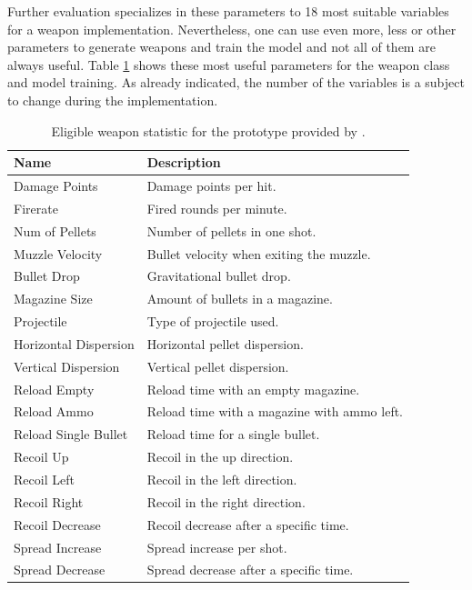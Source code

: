 \documentclass[MGS,Master,english]{twbook}%
\begin{document}
Further evaluation specializes in these parameters to 18 most suitable variables for a weapon implementation. Nevertheless, one can use even more, less or other parameters to generate weapons and train the model and not all of them are always useful. Table \ref{battlefield::weaponStats} shows these most useful parameters for the weapon class and model training. As already indicated, the number of the variables is a subject to change during the implementation.
\begin{table}[!ht]
	\centering
	\begin{tabular}{|l|l|}
		\hline
		\textbf{Name}         & \textbf{Description}                         \\ \hline\hline
		Damage Points         & Damage points per hit.                       \\ \hline
		Firerate              & Fired rounds per minute.                     \\ \hline
		Num of Pellets        & Number of pellets in one shot.               \\ \hline
		Muzzle Velocity       & Bullet velocity when exiting the muzzle.     \\ \hline
		Bullet Drop           & Gravitational bullet drop.                   \\ \hline
		Magazine Size         & Amount of bullets in a magazine.             \\ \hline
		Projectile            & Type of projectile used.                     \\ \hline
		Horizontal Dispersion & Horizontal pellet dispersion.                \\ \hline
		Vertical Dispersion   & Vertical pellet dispersion.                  \\ \hline
		Reload Empty          & Reload time with an empty magazine.          \\ \hline
		Reload Ammo           & Reload time with a magazine with ammo left. \\ \hline
		Reload Single Bullet  & Reload time for a single bullet.             \\ \hline
		Recoil Up             & Recoil in the up direction.                      \\ \hline
		Recoil Left           & Recoil in the left direction.                    \\ \hline
		Recoil Right          & Recoil in the right direction.                   \\ \hline
		Recoil Decrease       & Recoil decrease after a specific time.       \\ \hline
		Spread Increase       & Spread increase per shot.                    \\ \hline
		Spread Decrease       & Spread decrease after a specific time.       \\ \hline
	\end{tabular}
	\caption{Eligible weapon statistic for the prototype provided by \protect\cite{symthic::bf1stats}.}
	\label{battlefield::weaponStats}
\end{table}
\end{document}
